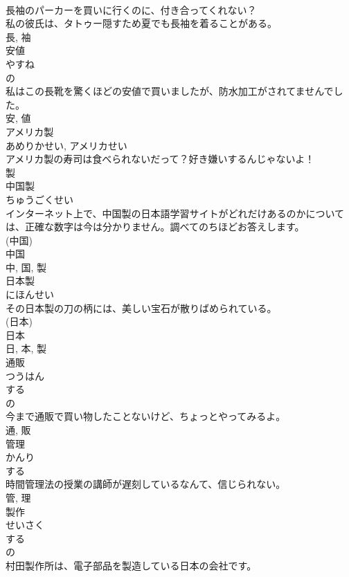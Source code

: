 \documentclass[8pt]{extreport}
\begin{document}
\begin{CJK}{UTF8}{min}
\\	長袖のパーカーを買いに行くのに、付き合ってくれない？	
\\	私の彼氏は、タトゥー隠すため夏でも長袖を着ることがある。	
\\	長, 袖	
\\	安値	
\\	やすね	
\\	の 
\\	私はこの長靴を驚くほどの安値で買いましたが、防水加工がされてませんでした。	
\\	安, 値	
\\	アメリカ製	
\\	あめりかせい, アメリカせい	
\\	アメリカ製の寿司は食べられないだって？好き嫌いするんじゃないよ！	
\\	製	
\\	中国製	
\\	ちゅうごくせい	
\\	インターネット上で、中国製の日本語学習サイトがどれだけあるのかについては、正確な数字は今は分かりません。調べてのちほどお答えします。	
\\	(中国) 
\\	中国 
\\	中, 国, 製	
\\	日本製	
\\	にほんせい	
\\	その日本製の刀の柄には、美しい宝石が散りばめられている。	
\\	(日本) 
\\	日本 
\\	日, 本, 製	
\\	通販	
\\	つうはん	
\\	する 
\\	の 
\\	今まで通販で買い物したことないけど、ちょっとやってみるよ。	
\\	通, 販	
\\	管理	
\\	かんり	
\\	する 
\\	時間管理法の授業の講師が遅刻しているなんて、信じられない。	
\\	管, 理	
\\	製作	
\\	せいさく	
\\	する 
\\	の 
\\	村田製作所は、電子部品を製造している日本の会社です。	

\end{CJK}
\end{document}
